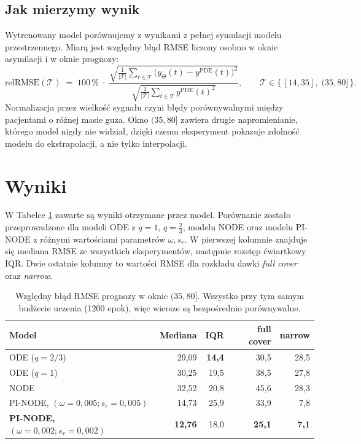 \documentclass[11pt,a4paper]{article}
\begin{document}
\subsection{Jak mierzymy wynik}

Wytrenowany model porównujemy z wynikami z pełnej symulacji modelu przestrzennego. Miarą jest względny błąd RMSE liczony osobno w oknie
asymilacji i w oknie prognozy:
\begin{equation}
\mathrm{relRMSE}(\mathcal{T}) \;=\; 100\,\%\;\cdot\;
\frac{\sqrt{\frac{1}{|\mathcal{T}|}\sum_{t\in\mathcal{T}} \big(y_\Theta(t) - y^{\mathrm{PDE}}(t)\big)^2}}
     {\sqrt{\frac{1}{|\mathcal{T}|}\sum_{t\in\mathcal{T}} y^{\mathrm{PDE}}(t)^2}},
\qquad
\mathcal{T} \in \{\,[14,35],\;(35,80]\,\}.
\label{eq:metryka}
\end{equation}
Normalizacja przez wielkość sygnału czyni błędy porównywalnymi między pacjentami
o różnej masie guza. Okno $(35,80]$ zawiera drugie napromienianie,
którego model nigdy nie widział, dzięki czemu eksperyment pokazuje zdolność modelu do ekstrapolacji, a nie tylko interpolacji.

\section{Wyniki}
\label{sec:wyniki}

W Tabelce \ref{tab:dokladnosc} zawarte są wyniki otrzymane przez model. Porównanie zostało przeprowadzone dla modeli ODE z $q=1$, $q=\frac{2}{3}$, modelu NODE oraz modelu PI-NODE z różnymi wartościami parametrów $\omega, s_r$. W pierwszej kolumnie znajduje się mediana RMSE ze wszystkich eksperymentów, następnie rozstęp ćwiartkowy IQR. Dwie ostatnie kolumny to wartości RMSE dla rozkładu dawki \emph{full cover} oraz \emph{narrow}.

\begin{table}[H]
\centering\footnotesize
\setlength{\tabcolsep}{6pt}
\begin{tabular}{@{}lrrrr@{}}
\toprule
\textbf{Model} & \textbf{Mediana} & \textbf{IQR} & \textbf{full cover} & \textbf{narrow} \\
\midrule
ODE ($q=2/3$)          & 29,09 & \textbf{14,4} & 30,5 & 28,5 \\
ODE ($q=1$)      & 30,25 & 19,5 & 38,5 & 27,8 \\
NODE           & 32,52 & 20,8 & 45,6 & 28,3 \\
\midrule
PI-NODE, $(\omega = 0{,}005 ; s_r = 0{,}005)$        & 14,73 & 25,9 & 33,9 & 7,8 \\
\textbf{PI-NODE, $(\omega = 0{,}002; s_r=0{,}002)$} & \textbf{12,76} & 18,0 & \textbf{25,1} & \textbf{7,1} \\
\bottomrule
\end{tabular}
\caption{Względny błąd RMSE prognozy w oknie $(35,80]$.
Wszystko przy tym samym budżecie uczenia (1200 epok), więc wiersze są bezpośrednio
porównywalne.}
\label{tab:dokladnosc}
\end{table}
\end{document}
